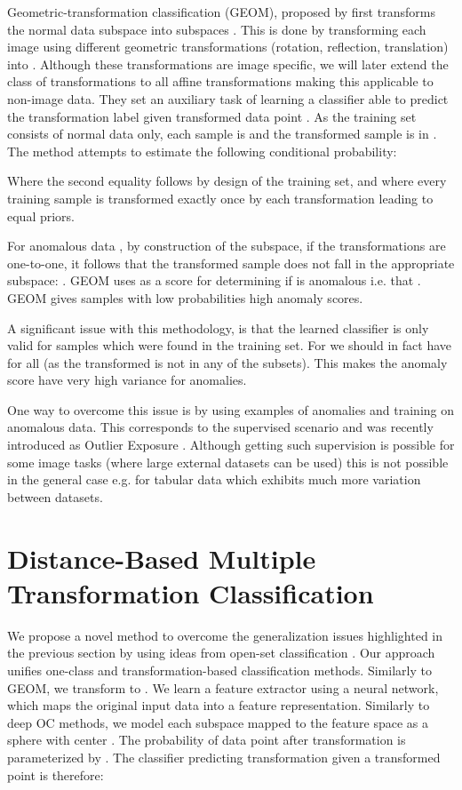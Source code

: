 \documentclass{article} \usepackage{iclr2020_conference,times}
\begin{document}
Geometric-transformation classification (GEOM), proposed by \cite{golan2018deep} first transforms the normal data subspace  into  subspaces . This is done by transforming each image  using  different geometric transformations (rotation, reflection, translation) into . Although these transformations are image specific, we will later extend the class of transformations to all affine transformations making this applicable to non-image data. They set an auxiliary task of learning a classifier able to predict the transformation label  given transformed data point . As the training set consists of normal data only, each sample is  and the transformed sample is in . The method attempts to estimate the following conditional probability:



Where the second equality follows by design of the training set, and where every training sample is transformed exactly once by each transformation leading to equal priors.

For anomalous data , by construction of the subspace, if the transformations  are one-to-one, it follows that the transformed sample does not fall in the appropriate subspace: . GEOM uses  as a score for determining if  is anomalous i.e. that . GEOM gives samples with low probabilities  high anomaly scores.  

A significant issue with this methodology, is that the learned classifier  is only valid for samples  which were found in the training set. For  we should in fact have  for all  (as the transformed  is not in any of the subsets). This makes the anomaly score  have very high variance for anomalies.

One way to overcome this issue is by using examples of anomalies  and training  on anomalous data. This corresponds to the supervised scenario and was recently introduced as Outlier Exposure \citep{hendrycks2018deep}. Although getting such supervision is possible for some image tasks (where large external datasets can be used) this is not possible in the general case e.g. for tabular data which exhibits much more variation between datasets.  

\section{Distance-Based Multiple Transformation Classification}
\label{sec:analysis_class}

We propose a novel method to overcome the generalization issues highlighted in the previous section by using ideas from open-set classification \citep{bendale2016towards}. Our approach unifies one-class and transformation-based classification methods. Similarly to GEOM, we transform  to . We learn a feature extractor  using a neural network, which maps the original input data into a feature representation. Similarly to deep OC methods, we model each subspace  mapped to the feature space  as a sphere with center . The probability of data point  after transformation  is parameterized by . The classifier predicting transformation  given a transformed point is therefore:
\end{document}

